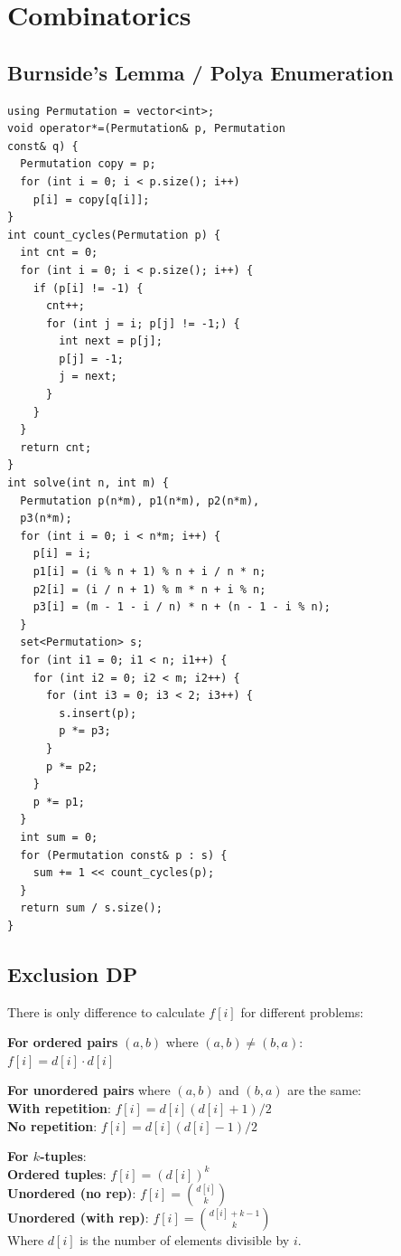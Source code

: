 \section{Combinatorics}
\subsection{Burnside's Lemma / Polya Enumeration}
\begin{verbatim}
using Permutation = vector<int>;
void operator*=(Permutation& p, Permutation
const& q) {
  Permutation copy = p;
  for (int i = 0; i < p.size(); i++)
    p[i] = copy[q[i]];
}
int count_cycles(Permutation p) {
  int cnt = 0;
  for (int i = 0; i < p.size(); i++) {
    if (p[i] != -1) {
      cnt++;
      for (int j = i; p[j] != -1;) {
        int next = p[j];
        p[j] = -1;
        j = next;
      }
    }
  }
  return cnt;
}
int solve(int n, int m) {
  Permutation p(n*m), p1(n*m), p2(n*m),
  p3(n*m);
  for (int i = 0; i < n*m; i++) {
    p[i] = i;
    p1[i] = (i % n + 1) % n + i / n * n;
    p2[i] = (i / n + 1) % m * n + i % n;
    p3[i] = (m - 1 - i / n) * n + (n - 1 - i % n);
  }
  set<Permutation> s;
  for (int i1 = 0; i1 < n; i1++) {
    for (int i2 = 0; i2 < m; i2++) {
      for (int i3 = 0; i3 < 2; i3++) {
        s.insert(p);
        p *= p3;
      }
      p *= p2;
    }
    p *= p1;
  }
  int sum = 0;
  for (Permutation const& p : s) {
    sum += 1 << count_cycles(p);
  }
  return sum / s.size();
}
\end{verbatim}
\subsection{Exclusion DP}
There is only difference to calculate $f[i]$ for different problems:

\textbf{For ordered pairs} $(a, b)$ where $(a, b) \neq (b, a)$: \\
$f[i] = d[i] \cdot d[i]$

\textbf{For unordered pairs} where $(a, b)$ and $(b, a)$ are the same: \\
\textbullet{} \textbf{With repetition}: $f[i] = d[i](d[i]+1)/2$ \\
\textbullet{} \textbf{No repetition}: $f[i] = d[i](d[i]-1)/2$

\textbf{For $k$-tuples}: \\
\textbullet{} \textbf{Ordered tuples}: $f[i] = (d[i])^k$ \\
\textbullet{} \textbf{Unordered (no rep)}: $f[i] = \binom{d[i]}{k}$ \\
\textbullet{} \textbf{Unordered (with rep)}: $f[i] = \binom{d[i]+k-1}{k}$ \\
Where $d[i]$ is the number of elements divisible by $i$.
